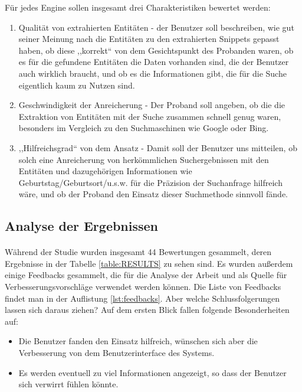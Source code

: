Für jedes Engine sollen insgesamt drei Charakteristiken bewertet werden:
\begin{enumerate}
\item Qualität von extrahierten Entitäten - der Benutzer soll beschreiben, wie gut seiner Meinung nach die Entitäten zu den extrahierten Snippets gepasst haben, ob diese ,,korrekt`` von dem Gesichtspunkt des Probanden waren, ob es für die gefundene Entitäten die Daten vorhanden sind, die der Benutzer auch wirklich braucht, und ob es die Informationen gibt, die für die Suche eigentlich kaum zu Nutzen sind.
\item Geschwindigkeit der Anreicherung - Der Proband soll angeben, ob die die Extraktion von Entitäten mit der Suche zusammen schnell genug waren, besonders im Vergleich zu den Suchmaschinen wie Google oder Bing.
\item ,,Hilfreichsgrad`` von dem Ansatz - Damit soll der Benutzer uns mitteilen, ob solch eine Anreicherung von herkömmlichen Suchergebnissen mit den Entitäten und dazugehörigen Informationen wie Geburtstag/Geburtsort/u.s.w. für die Präzision der Suchanfrage hilfreich wäre, und ob der Proband den Einsatz dieser Suchmethode sinnvoll fände.  
\end{enumerate}

\subsection{Analyse der Ergebnissen}
\paragraph{}
Während der Studie wurden insgesamt 44 Bewertungen gesammelt, deren Ergebnisse in der Tabelle \ref{table:RESULTS} zu sehen sind. Es wurden außerdem einige Feedbacks gesammelt, die für die Analyse der Arbeit und als Quelle für Verbesserungsvorschläge verwendet werden können. Die Liste von Feedbacks findet man in der Auflistung \ref{lst:feedbacks}. Aber welche Schlussfolgerungen lassen sich daraus ziehen? Auf dem ersten Blick fallen folgende Besonderheiten auf:
\begin{itemize}
\item Die Benutzer fanden den Einsatz hilfreich, wünschen sich aber die Verbesserung von dem Benutzerinterface des Systems.
\item Es werden eventuell zu viel Informationen angezeigt, so dass der Benutzer sich verwirrt fühlen könnte.
\end{itemize}

